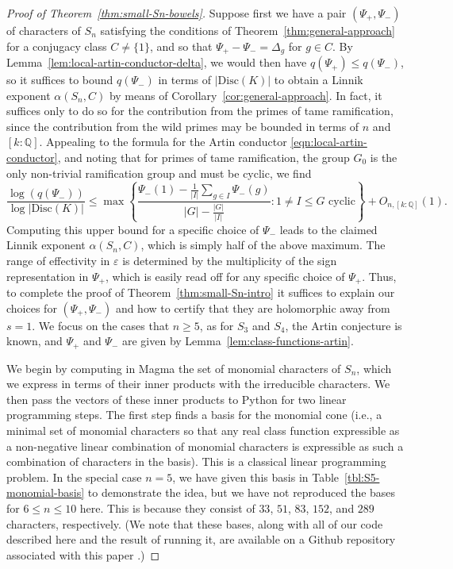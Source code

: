 \documentclass[12pt]{amsart}
\theoremstyle{definition} \newtheorem{definition}[theorem]{Definition}
\theoremstyle{example} \newtheorem{example}[theorem]{Example}
\theoremstyle{remark} \newtheorem{remark}{Remark}[theorem]
\numberwithin{equation}{section}
\numberwithin{theorem}{section}
\renewcommand{\epsilon}{\varepsilon}
\renewcommand{\leq}{\leqslant}
\renewcommand{\geq}{\geqslant}
\newcommand{\Q}{\mathbb{Q}}
\begin{document}
	
	\begin{proof}[Proof of Theorem~\ref{thm:small-Sn-bowels}]
		Suppose first we have a pair $(\Psi_+,\Psi_-)$ of characters of $S_n$ satisfying the conditions of Theorem~\ref{thm:general-approach} for a conjugacy class $C \ne \{1\}$, and so that $\Psi_+ - \Psi_- = \Delta_g$ for $g \in C$.  By Lemma~\ref{lem:local-artin-conductor-delta}, we would then have $q(\Psi_+) \leq q(\Psi_-)$, so it suffices to bound $q(\Psi_-)$ in terms of $|\mathrm{Disc}(K)|$ to obtain a Linnik exponent $\alpha(S_n,C)$ by means of Corollary~\ref{cor:general-approach}.  In fact, it suffices only to do so for the contribution from the primes of tame ramification, since the contribution from the wild primes may be bounded in terms of $n$ and $[k:\Q]$.  Appealing to the formula for the Artin conductor \eqref{eqn:local-artin-conductor}, and noting that for primes of tame ramification, the group $G_0$ is the only non-trivial ramification group and must be cyclic, we find
		\begin{equation} \label{eqn:tame-conductor-bound}
			\frac{\log(q(\Psi_-))}{\log |\mathrm{Disc}(K)|}
				\leq \max\left\{ \frac{\Psi_-(1) - \frac{1}{|I|} \sum_{g \in I} \Psi_-(g)}{|G| - \frac{|G|}{|I|}} : 1 \ne I \leq G \text{ cyclic} \right\} + O_{n,[k:\Q]}(1).
		\end{equation}
		Computing this upper bound for a specific choice of $\Psi_-$ leads to the claimed Linnik exponent $\alpha(S_n,C)$, which is simply half of the above maximum.  The range of effectivity in $\epsilon$ is determined by the multiplicity of the sign representation in $\Psi_+$, which is easily read off for any specific choice of $\Psi_+$.
		Thus, to complete the proof of Theorem~\ref{thm:small-Sn-intro} it suffices to explain our choices for $(\Psi_+,\Psi_-)$ and how to certify that they are holomorphic away from $s=1$.  		
		We focus on the cases that $n \geq 5$, as for $S_3$ and $S_4$, the Artin conjecture is known, and $\Psi_+$ and $\Psi_-$ are given by Lemma~\ref{lem:class-functions-artin}.  
		
		We begin by computing in Magma \cite{Magma} the set of monomial characters of $S_n$, which we express in terms of their inner products with the irreducible characters.  We then pass the vectors of these inner products to Python for two linear programming steps.  The first step finds a basis for the monomial cone (i.e., a minimal set of monomial characters so that any real class function expressible as a non-negative linear combination of monomial characters is expressible as such a combination of characters in the basis).  This is a classical linear programming problem.  In the special case $n=5$, we have given this basis in Table~\ref{tbl:S5-monomial-basis} to demonstrate the idea, but we have not reproduced the bases for $6 \leq n \leq 10$ here.  This is because they consist of $33$, $51$, $83$, $152$, and $289$ characters, respectively.  (We note that these bases, along with all of our code described here and the result of running it, are available on a Github repository associated with this paper \cite{github}.) 


\end{proof}
\end{document}
